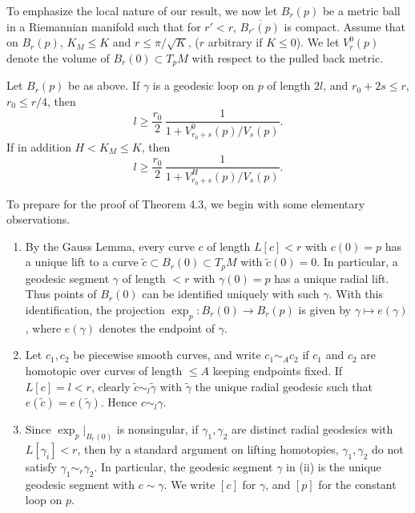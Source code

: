 To emphasize the local nature of our result, we now let $B_r(p)$ be a metric
ball in a Riemannian manifold such that for $r' < r$, $\overline{B_{r'}(p)}$ is
compact. Assume that on $B_r(p)$, $K_M \le K$ and $r \le \pi/\sqrt{K}$, ($r$
arbitrary if $K \le 0$). We let $V_r^0(p)$ denote the volume of $B_r(0) \subset
T_pM$ with respect to the pulled back metric.

\begin{theorem}
\label{thm:local-injectivity-radius-bound}

Let $B_r(p)$ be as above. If $\gamma$ is a geodesic loop on $p$ of length
$2l$, and $r_0+2s \le r$, $r_0 \le r/4$, then
\begin{equation}\tag{4.21}
l \ge \frac{r_0}{2}\,\frac{1}{1+V^0_{r_0+s}(p)/V_s(p)}.
\end{equation}
If in addition $H < K_M \le K$, then
\begin{equation}\tag{4.22}
l \ge \frac{r_0}{2}\,\frac{1}{1+V^H_{r_0+s}(p)/V_s(p)}.
\end{equation}
\end{theorem}

To prepare for the proof of Theorem 4.3, we begin with some elementary
observations.

\begin{enumerate}
\item[(i)] By the Gauss Lemma, every curve $c$ of length $L[c] < r$ with
$c(0)=p$ has a unique lift to a curve $\tilde c \subset B_r(0) \subset T_pM$ with
$\tilde c(0)=0$. In particular, a geodesic segment $\gamma$ of length $< r$ with
$\gamma(0)=p$ has a unique radial lift. Thus points of $B_r(0)$ can be
identified uniquely with such $\gamma$. With this identification, the projection
$\exp_p : B_r(0) \to B_r(p)$ is given by $\gamma \mapsto e(\gamma)$, where
$e(\gamma)$ denotes the endpoint of $\gamma$.

\item[(ii)] Let $c_1,c_2$ be piecewise smooth curves, and write $c_1 \sim_A c_2$
if $c_1$ and $c_2$ are homotopic over curves of length $\le A$ keeping endpoints
fixed. If $L[c]=l<r$, clearly $\tilde c \sim_l \tilde\gamma$ with $\tilde\gamma$
the unique radial geodesic such that $e(\tilde c)=e(\tilde\gamma)$. Hence
$c \sim_l \gamma$.

\item[(iii)] Since $\exp_p \vert_{B_r(0)}$ is nonsingular, if $\gamma_1,\gamma_2$
are distinct radial geodesics with $L[\gamma_i]<r$, then by a standard argument
on lifting homotopies, $\gamma_1,\gamma_2$ do not satisfy $\gamma_1 \sim_r
\gamma_2$. In particular, the geodesic segment $\gamma$ in (ii) is the unique
geodesic segment with $c \sim \gamma$. We write $[c]$ for $\gamma$, and
$[p]$ for the constant loop on $p$.
\end{enumerate}

